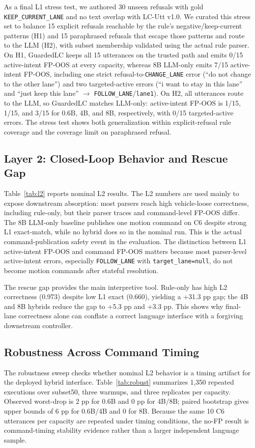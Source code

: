 \documentclass[conference]{IEEEtran}
\newcommand{\ours}{GuardedLC}
\begin{document}
As a final L1 stress test, we authored 30 unseen refusals with gold \texttt{KEEP\_CURRENT\_LANE} and no text overlap with LC-Utt v1.0. We curated this stress set to balance 15 explicit refusals reachable by the rule's negative/keep-current patterns (H1) and 15 paraphrased refusals that escape those patterns and route to the LLM (H2), with subset membership validated using the actual rule parser. On H1, \ours{} keeps all 15 utterances on the trusted path and emits 0/15 active-intent FP-OOS at every capacity, whereas 8B LLM-only emits 7/15 active-intent FP-OOS, including one strict refusal-to-\texttt{CHANGE\_LANE} error (``do not change to the other lane'') and two targeted-active errors (``i want to stay in this lane'' and ``just keep this lane'' $\rightarrow$ \texttt{FOLLOW\_LANE}/\texttt{lane1}). On H2, all utterances route to the LLM, so \ours{} matches LLM-only: active-intent FP-OOS is 1/15, 1/15, and 3/15 for 0.6B, 4B, and 8B, respectively, with 0/15 targeted-active errors. The stress test shows both generalization within explicit-refusal rule coverage and the coverage limit on paraphrased refusal.

\subsection{Layer 2: Closed-Loop Behavior and Rescue Gap}
Table~\ref{tab:l2} reports nominal L2 results. The L2 numbers are used mainly to expose downstream absorption: most parsers reach high vehicle-loose correctness, including rule-only, but their parser traces and command-level FP-OOS differ. The 8B LLM-only baseline publishes one motion command on C6 despite strong L1 exact-match, while no hybrid does so in the nominal run. This is the actual command-publication safety event in the evaluation. The distinction between L1 active-intent FP-OOS and command FP-OOS matters because most parser-level active-intent errors, especially \texttt{FOLLOW\_LANE} with \texttt{target\_lane=null}, do not become motion commands after stateful resolution.



The rescue gap provides the main interpretive tool. Rule-only has high L2 correctness (0.973) despite low L1 exact (0.660), yielding a +31.3 pp gap; the 4B and 8B hybrids reduce the gap to +5.3 pp and +3.3 pp. This shows why final-lane correctness alone can conflate a correct language interface with a forgiving downstream controller.
\subsection{Robustness Across Command Timing}
The robustness sweep checks whether nominal L2 behavior is a timing artifact for the deployed hybrid interface. Table~\ref{tab:robust} summarizes 1,350 repeated executions over subset50, three warmups, and three replicates per capacity. Observed worst-drop is 2 pp for 0.6B and 0 pp for 4B/8B; paired bootstrap gives upper bounds of 6 pp for 0.6B/4B and 0 for 8B. Because the same 10 C6 utterances per capacity are repeated under timing conditions, the no-FP result is command-timing stability evidence rather than a larger independent language sample.
\end{document}
